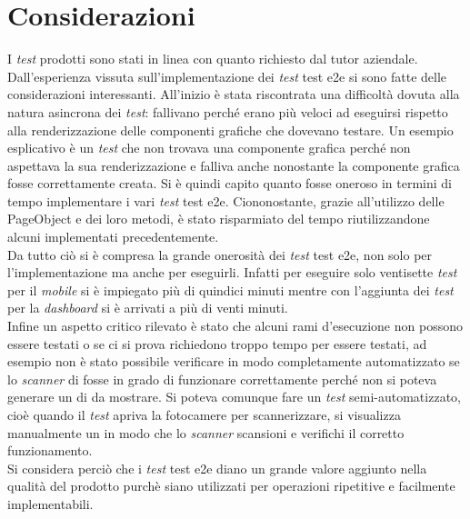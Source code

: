 \section{Considerazioni}
\label{cap:cons2}
I \emph{test} prodotti sono stati in linea con quanto richiesto dal tutor aziendale. Dall'esperienza vissuta sull'implementazione dei \emph{test} \gls{test e2e} si sono fatte delle considerazioni interessanti. All'inizio è stata riscontrata una difficoltà dovuta alla natura asincrona dei \emph{test}: fallivano perché erano più veloci ad eseguirsi rispetto alla renderizzazione delle componenti grafiche che dovevano testare. Un esempio esplicativo è un \emph{test} che non trovava una componente grafica perché non aspettava la sua renderizzazione e falliva anche nonostante la componente grafica fosse correttamente creata. 
Si è quindi capito quanto fosse oneroso in termini di tempo implementare i vari \emph{test} \gls{test e2e}. Ciononostante, grazie all'utilizzo delle PageObject e dei loro metodi, è stato risparmiato del tempo riutilizzandone alcuni implementati precedentemente.\\

Da tutto ciò si è compresa la grande onerosità dei \emph{test} \gls{test e2e}, non solo per l'implementazione ma anche per eseguirli. Infatti per eseguire solo ventisette \emph{test} per il \emph{mobile} si è impiegato più di quindici minuti mentre con l'aggiunta dei \emph{test} per la \emph{dashboard} si è arrivati a più di venti minuti.\\

Infine un aspetto critico rilevato è stato che alcuni rami d'esecuzione non possono essere testati o se ci si prova richiedono troppo tempo per essere testati, ad esempio non è stato possibile verificare in modo completamente automatizzato se lo \emph{scanner} di  fosse in grado di funzionare correttamente perché non si poteva generare un  di  da mostrare. Si poteva comunque fare un \emph{test} semi-automatizzato, cioè quando il \emph{test} apriva la fotocamere per scannerizzare, si visualizza manualmente un  in modo che lo \emph{scanner} scansioni e verifichi il corretto funzionamento.\\

Si considera perciò che i \emph{test} \gls{test e2e} diano un grande valore aggiunto nella qualità del prodotto purchè siano utilizzati per operazioni ripetitive e facilmente implementabili.
